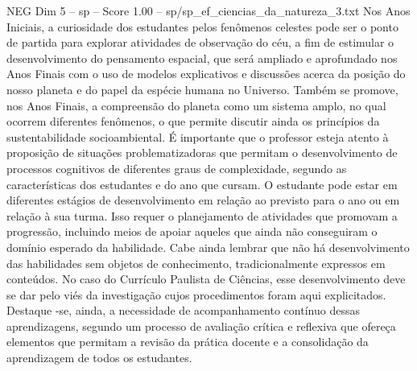\begin{textsample}{NEG Dim 5 – sp – Score 1.00 – sp/sp\_ef\_ciencias\_da\_natureza\_3.txt}
Nos Anos Iniciais, a curiosidade dos estudantes pelos fenômenos celestes pode ser o ponto de partida para explorar atividades de observação do céu, a fim de estimular o desenvolvimento do pensamento espacial, que será ampliado e aprofundado nos Anos Finais com o uso de modelos explicativos e discussões acerca da posição do nosso planeta e do papel da espécie humana no Universo.
Também se promove, nos Anos Finais, a compreensão do planeta como um sistema amplo, no qual ocorrem diferentes fenômenos, o que permite discutir ainda os princípios da sustentabilidade socioambiental.
É importante que o professor esteja atento à proposição de situações problematizadoras que permitam o desenvolvimento de processos cognitivos de diferentes graus de complexidade, segundo as características dos estudantes e do ano que cursam.
O estudante pode estar em diferentes estágios de desenvolvimento em relação ao previsto para o ano ou em relação à sua turma.
Isso requer o planejamento de atividades que promovam a progressão, incluindo meios de apoiar aqueles que ainda não conseguiram o domínio esperado da habilidade.
Cabe ainda lembrar que não há desenvolvimento das habilidades sem objetos de conhecimento, tradicionalmente expressos em conteúdos.
No caso do Currículo Paulista de Ciências, esse desenvolvimento deve se dar pelo viés da investigação cujos procedimentos foram aqui explicitados.
Destaque -se, ainda, a necessidade de acompanhamento contínuo dessas aprendizagens, segundo um processo de avaliação crítica e reflexiva que ofereça elementos que permitam a revisão da prática docente e a consolidação da aprendizagem de todos os estudantes.

\end{textsample}
